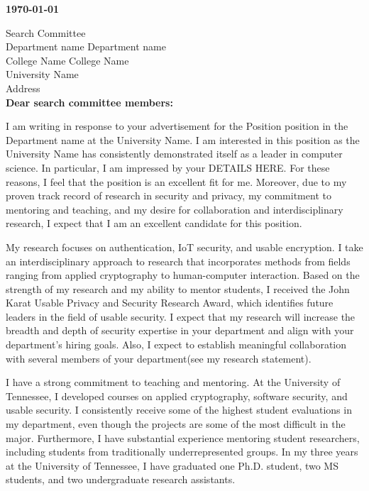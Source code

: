 \documentclass[letter]{cv}
\def\university{University Name\xspace}
\def\college{College Name\xspace}
\def\department{Department name\xspace}
\def\unit{department\xspace}
\def\address{Address\xspace}
\def\position{Position\xspace}
\begin{document}
\maketitle

\textbf{\today}

Search Committee\\
\ifdefined \department \department \\\fi
\ifdefined \college \college \\\fi
\university\\
\address\\

\textbf{Dear search committee members:}



I am writing in response to your advertisement for the \position position in the \department at the \university.
I am interested in this position as the \university has consistently demonstrated itself as a leader in computer science.
In particular, I am impressed by your DETAILS HERE.
For these reasons, I feel that the position is an excellent fit for me.
Moreover, due to my proven track record of research in security and privacy, my commitment to mentoring and teaching, and my desire for collaboration and interdisciplinary research, I expect that I am an excellent candidate for this position.

My research focuses on authentication, IoT security, and usable encryption.
I take an interdisciplinary approach to research that incorporates methods from fields ranging from applied cryptography to human-computer interaction.
Based on the strength of my research and my ability to mentor students, I received the John Karat Usable Privacy and Security Research Award, which identifies future leaders in the field of usable security.
I expect that my research will increase the breadth and depth of security expertise in your \unit and align with your \unit's hiring goals.
Also, I expect to establish meaningful collaboration with several members of your \unit (see my research statement).

I have a strong commitment to teaching and mentoring.
At the University of Tennessee, I developed courses on applied cryptography, software security, and usable security.
I consistently receive some of the highest student evaluations in my department, even though the projects are some of the most difficult in the major.
Furthermore, I have substantial experience mentoring student researchers, including students from traditionally underrepresented groups.
In my three years at the University of Tennessee, I have graduated one Ph.D. student, two MS students, and two undergraduate research assistants.
\end{document}
